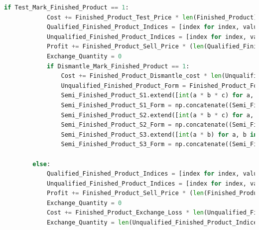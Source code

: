 \documentclass[withoutpreface,bwprint]{cumcmthesis} %
\begin{document}
\begin{appendices}
\begin{lstlisting}[language=python]
		if Test_Mark_Finished_Product == 1:
			Cost += Finished_Product_Test_Price * len(Finished_Product)
			Qualified_Finished_Product_Indices = [index for index, value in enumerate(Finished_Product) if value == 1]
			Unqualified_Finished_Product_Indices = [index for index, value in enumerate(Finished_Product) if value == 0]
			Profit += Finished_Product_Sell_Price * (len(Qualified_Finished_Product_Indices) - Exchange_Quantity)
			Exchange_Quantity = 0
			if Dismantle_Mark_Finished_Product == 1:
				Cost += Finished_Product_Dismantle_cost * len(Unqualified_Finished_Product_Indices)
				Unqualified_Finished_Product_Form = Finished_Product_Form[:, Unqualified_Finished_Product_Indices]
				Semi_Finished_Product_S1.extend([int(a * b * c) for a, b, c in zip(Unqualified_Finished_Product_Form[0], Unqualified_Finished_Product_Form[1], Unqualified_Finished_Product_Form[2])])
				Semi_Finished_Product_S1_Form = np.concatenate((Semi_Finished_Product_S1_Form, np.array([Unqualified_Finished_Product_Form[0].tolist(), Unqualified_Finished_Product_Form[1].tolist(), Unqualified_Finished_Product_Form[2].tolist()])), axis=1)
				Semi_Finished_Product_S2.extend([int(a * b * c) for a, b, c in zip(Unqualified_Finished_Product_Form[3], Unqualified_Finished_Product_Form[4], Unqualified_Finished_Product_Form[5])])
				Semi_Finished_Product_S2_Form = np.concatenate((Semi_Finished_Product_S2_Form, np.array([Unqualified_Finished_Product_Form[3].tolist(), Unqualified_Finished_Product_Form[4].tolist(), Unqualified_Finished_Product_Form[5].tolist()])), axis=1)
				Semi_Finished_Product_S3.extend([int(a * b) for a, b in zip(Unqualified_Finished_Product_Form[6], Unqualified_Finished_Product_Form[7])])
				Semi_Finished_Product_S3_Form = np.concatenate((Semi_Finished_Product_S3_Form, np.array([Unqualified_Finished_Product_Form[6].tolist(), Unqualified_Finished_Product_Form[7].tolist()])), axis=1)
	
		else:
			Qualified_Finished_Product_Indices = [index for index, value in enumerate(Finished_Product) if value == 1]
			Unqualified_Finished_Product_Indices = [index for index, value in enumerate(Finished_Product) if value == 0]
			Profit += Finished_Product_Sell_Price * (len(Finished_Product) - Exchange_Quantity)
			Exchange_Quantity = 0
			Cost += Finished_Product_Exchange_Loss * len(Unqualified_Finished_Product_Indices)
			Exchange_Quantity = len(Unqualified_Finished_Product_Indices)
	

\end{lstlisting}
\end{appendices}
\end{document}
